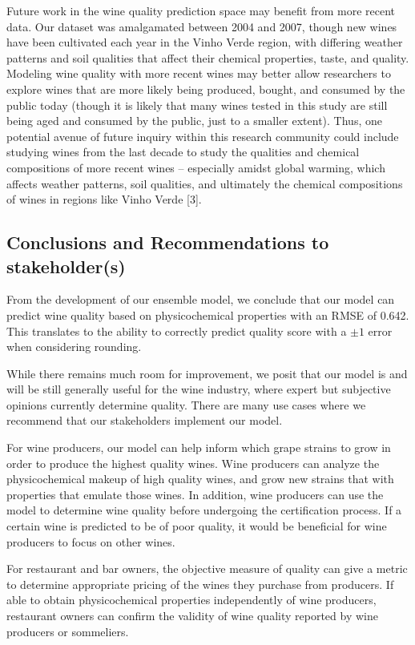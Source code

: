 \documentclass[
  letterpaper,
  DIV=11,
  numbers=noendperiod]{scrartcl}
\begin{document}
Future work in the wine quality prediction space may benefit from more
recent data. Our dataset was amalgamated between 2004 and 2007, though
new wines have been cultivated each year in the Vinho Verde region, with
differing weather patterns and soil qualities that affect their chemical
properties, taste, and quality. Modeling wine quality with more recent
wines may better allow researchers to explore wines that are more likely
being produced, bought, and consumed by the public today (though it is
likely that many wines tested in this study are still being aged and
consumed by the public, just to a smaller extent). Thus, one potential
avenue of future inquiry within this research community could include
studying wines from the last decade to study the qualities and chemical
compositions of more recent wines -- especially amidst global warming,
which affects weather patterns, soil qualities, and ultimately the
chemical compositions of wines in regions like Vinho Verde {[}3{]}.

\hypertarget{conclusions-and-recommendations-to-stakeholders}{%
\subsection{Conclusions and Recommendations to
stakeholder(s)}\label{conclusions-and-recommendations-to-stakeholders}}

From the development of our ensemble model, we conclude that our model
can predict wine quality based on physicochemical properties with an
RMSE of 0.642. This translates to the ability to correctly predict
quality score with a \(\pm 1\) error when considering rounding.

While there remains much room for improvement, we posit that our model
is and will be still generally useful for the wine industry, where
expert but subjective opinions currently determine quality. There are
many use cases where we recommend that our stakeholders implement our
model.

For wine producers, our model can help inform which grape strains to
grow in order to produce the highest quality wines. Wine producers can
analyze the physicochemical makeup of high quality wines, and grow new
strains that with properties that emulate those wines. In addition, wine
producers can use the model to determine wine quality before undergoing
the certification process. If a certain wine is predicted to be of poor
quality, it would be beneficial for wine producers to focus on other
wines.

For restaurant and bar owners, the objective measure of quality can give
a metric to determine appropriate pricing of the wines they purchase
from producers. If able to obtain physicochemical properties
independently of wine producers, restaurant owners can confirm the
validity of wine quality reported by wine producers or sommeliers.
\end{document}
